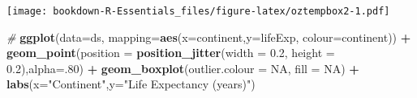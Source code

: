 \documentclass[
]{book}
\newenvironment{Shaded}{\begin{snugshade}}{\end{snugshade}}
\newcommand{\CommentTok}[1]{\textcolor[rgb]{0.56,0.35,0.01}{\textit{#1}}}
\newcommand{\DataTypeTok}[1]{\textcolor[rgb]{0.13,0.29,0.53}{#1}}
\newcommand{\DecValTok}[1]{\textcolor[rgb]{0.00,0.00,0.81}{#1}}
\newcommand{\FloatTok}[1]{\textcolor[rgb]{0.00,0.00,0.81}{#1}}
\newcommand{\KeywordTok}[1]{\textcolor[rgb]{0.13,0.29,0.53}{\textbf{#1}}}
\newcommand{\NormalTok}[1]{#1}
\newcommand{\OperatorTok}[1]{\textcolor[rgb]{0.81,0.36,0.00}{\textbf{#1}}}
\newcommand{\OtherTok}[1]{\textcolor[rgb]{0.56,0.35,0.01}{#1}}
\newcommand{\StringTok}[1]{\textcolor[rgb]{0.31,0.60,0.02}{#1}}
\begin{document}
\begin{Shaded}
\end{Shaded}

\texttt{[image: bookdown-R-Essentials\_files/figure-latex/oztempbox2-1.pdf]}

\begin{Shaded}
\begin{Highlighting}[]
\CommentTok{# }
\KeywordTok{ggplot}\NormalTok{(}\DataTypeTok{data=}\NormalTok{ds, }\DataTypeTok{mapping=}\KeywordTok{aes}\NormalTok{(}\DataTypeTok{x=}\NormalTok{continent,}\DataTypeTok{y=}\NormalTok{lifeExp, }\DataTypeTok{colour=}\NormalTok{continent)) }\OperatorTok{+}\StringTok{ }
\StringTok{  }\KeywordTok{geom_point}\NormalTok{(}\DataTypeTok{position =} \KeywordTok{position_jitter}\NormalTok{(}\DataTypeTok{width =} \FloatTok{0.2}\NormalTok{, }\DataTypeTok{height =} \FloatTok{0.2}\NormalTok{),}\DataTypeTok{alpha=}\NormalTok{.}\DecValTok{80}\NormalTok{) }\OperatorTok{+}
\StringTok{ }\KeywordTok{geom_boxplot}\NormalTok{(}\DataTypeTok{outlier.colour =} \OtherTok{NA}\NormalTok{, }\DataTypeTok{fill =} \OtherTok{NA}\NormalTok{) }\OperatorTok{+}\StringTok{ }
\StringTok{  }\KeywordTok{labs}\NormalTok{(}\DataTypeTok{x=}\StringTok{"Continent"}\NormalTok{,}\DataTypeTok{y=}\StringTok{"Life Expectancy (years)"}\NormalTok{)}
\end{Highlighting}
\end{Shaded}
\end{document}
